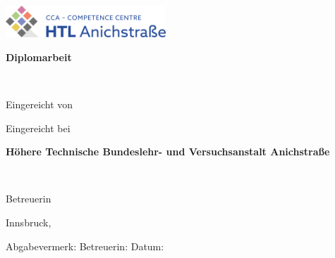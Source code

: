 
\newcommand{\myworktitle}{Diplomarbeit}  %
\newcommand{\myuniversity}{Höhere Technische Bundeslehr- und Versuchsanstalt Anichstraße} %
\newcommand{\mysubmissiontown}{Innsbruck}

\begin{titlepage}

{\sffamily

\begin{center}


\includegraphics[width=60mm]{figures/htl-logo}

\vfill\vfill\vfill
\vspace{1cm}
{\LARGE\bfseries\myworktitle}

\vfill\vfill\vfill

{\Large\bfseries\mytitle} \\
\mysubtitle

\vfill\vfill\vfill
\vfill\vfill\vfill



\vfill\vfill\vfill

\vspace{1cm}
Eingereicht von

{\bfseries\large\myauthor}
\vfill\vfill\vfill

\vspace{0.5cm}
Eingereicht bei

\vfill

{\bfseries\large\myuniversity}
\vfill

\myinstitute\\

\vfill\vfill\vfill

\vspace{0.5cm}
Betreuerin

\mysupervisor

\vfill\vfill\vfill\vfill

\mysubmissiontown, \mysubmissionmonth~\mysubmissionyear

\vspace{0.5cm}
\hrulefill

\begin{flushleft}
	

\vfill\vfill
Abgabevermerk:    \hspace{5cm} 					Betreuerin:
\vfill\vfill
Datum:       
\end{flushleft}
\end{center}
}%
\end{titlepage}
